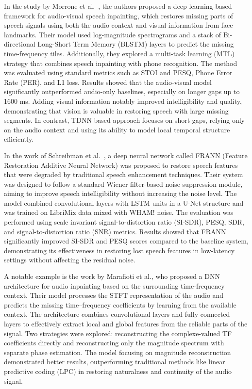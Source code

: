 In the study by Morrone et al.~\cite{morrone2021audiovisual}, the authors proposed a deep learning-based framework for audio-visual speech inpainting, which restores missing parts of speech signals using both the audio context and visual information from face landmarks. Their model used log-magnitude spectrograms and a stack of Bi-directional Long-Short Term Memory (BLSTM) layers to predict the missing time-frequency tiles. Additionally, they explored a multi-task learning (MTL) strategy that combines speech inpainting with phone recognition. The method was evaluated using standard metrics such as STOI and PESQ, Phone Error Rate (PER), and L1 loss. Results showed that the audio-visual model significantly outperformed audio-only baselines, especially on longer gaps up to 1600 ms. Adding visual information notably improved intelligibility and quality, demonstrating that vision is valuable in restoring speech with large missing segments. In contrast, TDNN-based approach focuses on short gaps, relying only on the audio context and using its ability to model local temporal structure efficiently.

\vspace{1em}

In the work of Schreibman et al.~\cite{schreibman2024frann}, a deep neural network called FRANN (Feature Restoration Additive Neural Network) was proposed to restore speech features that were degraded by traditional speech enhancement techniques. Their system was designed to follow a standard Wiener filter-based noise suppression module, aiming to improve speech intelligibility without increasing the noise level. The model combined convolutional layers with LSTM units in a U-Net structure and was trained on LibriMix data mixed with WHAM! noise. The evaluation was performed using scale invariant signal-to-distortion ratio (SI-SDR), PESQ, SDR, and signal-to-distortion ratio (SNR) metrics. Results showed that FRANN significantly improved SI-SDR and PESQ scores compared to the baseline system, demonstrating its effectiveness in restoring lost speech features in low-latency settings without affecting the residual noise.

\vspace{1em}

A notable example is the work by Marafioti et al.\cite{marafioti}, who proposed a DNN architecture for audio inpainting based on the surrounding time-frequency context. Their model processes the STFT representation of the audio and predicts the missing time–frequency coefficients by learning from the available context. The architecture combines convolutional layers and fully connected layers to effectively extract local and global features from the reliable parts of the signal. Two strategies were explored: reconstructing the complexe-valued TF coefficients directly and reconstructing only the magnitude spectrum with separate phase estimation. The model focusing on magnitude reconstruction demonstrated better results, outperforming traditional methods like linear predictive coding (LPC) in restoring naturalness and continuity of the audio signal.

